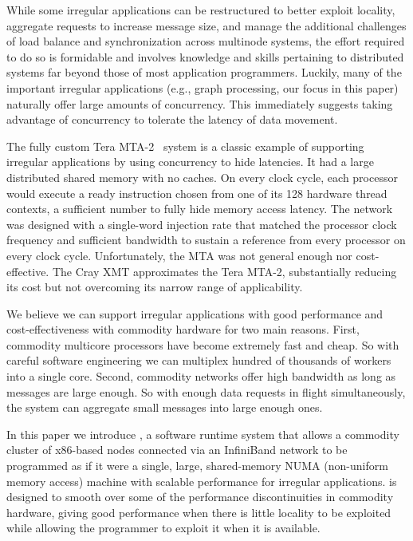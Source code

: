 While some irregular applications can be restructured to better exploit
locality, aggregate requests to increase message size, and manage the
additional challenges of load balance and synchronization across multinode
systems, the effort required to do so is formidable and involves knowledge and
skills pertaining to distributed systems far beyond those of most application
programmers. Luckily, many of the important irregular applications (e.g.,
graph processing, our focus in this paper) naturally offer large amounts of
concurrency. This immediately suggests taking advantage of concurrency to
tolerate the latency of data movement.

The fully custom Tera MTA-2~\cite{tera:mta1} system is a classic example of
supporting irregular applications by using concurrency to hide latencies. It
had a large distributed shared memory with no caches. On every clock cycle,
each processor would execute a ready instruction chosen from one of its 128
hardware thread contexts, a sufficient number to fully hide memory access
latency. The network was designed with a single-word injection rate that
matched the processor clock frequency and sufficient bandwidth to sustain a
reference from every processor on every clock cycle. Unfortunately, the MTA
was not general enough nor cost-effective. The Cray XMT approximates the Tera
MTA-2, substantially reducing its cost but not overcoming its narrow range of
applicability.

We believe we can support irregular applications with good performance and
cost-effectiveness with commodity hardware for two main reasons. First,
commodity multicore processors have become extremely fast and cheap. So with
careful software engineering we can multiplex hundred of thousands of
workers into a single core. Second, commodity networks offer high
bandwidth as long as messages are large enough. So with enough data requests
in flight simultaneously, the system can aggregate small messages into large
enough ones.

In this paper we introduce \Grappa, a software runtime system that allows a
commodity cluster of x86-based nodes connected via an InfiniBand network to be
programmed as if it were a single, large, shared-memory NUMA (non-uniform
memory access) machine with scalable performance for irregular applications.
\Grappa is designed to smooth over some of the performance discontinuities in
commodity hardware, giving good performance when there is little locality to
be exploited while allowing the programmer to exploit it when it is available.

